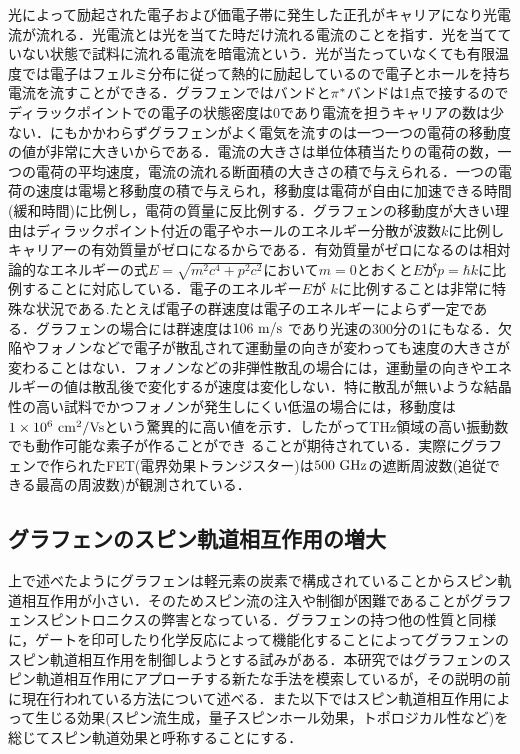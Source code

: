 光によって励起された電子および価電子帯に発生した正孔がキャリアになり光電流が流れる．光電流とは光を当てた時だけ流れる電流のことを指す．光を当てていない状態で試料に流れる電流を暗電流という．光が当たっていなくても有限温度では電子はフェルミ分布に従って熱的に励起しているので電子とホールを持ち電流を流すことができる．グラフェンでは\pi バンドと$\rm\pi^{*}$バンドは1点で接するのでディラックポイントでの電子の状態密度は0であり電流を担うキャリアの数は少ない．にもかかわらずグラフェンがよく電気を流すのは一つ一つの電荷の移動度の値が非常に大きいからである．電流の大きさは単位体積当たりの電荷の数，一つの電荷の平均速度，電流の流れる断面積の大きさの積で与えられる．一つの電荷の速度は電場と移動度の積で与えられ，移動度は電荷が自由に加速できる時間(緩和時間)に比例し，電荷の質量に反比例する．グラフェンの移動度が大きい理由はディラックポイント付近の電子やホールのエネルギー分散が波数$k$に比例しキャリアーの有効質量がゼロになるからである．有効質量がゼロになるのは相対論的なエネルギーの式$E = \sqrt{m^{2}c^{4} + p^{2}c^{2}}$において$m=0$とおくと$E$が$p=\hbar k$に比例することに対応している．電子のエネルギー$E$が $k$に比例することは非常に特殊な状況である.たとえば電子の群速度は電子のエネルギーによらず一定である．グラフェンの場合には群速度は$106\rm\ m/s$ であり光速の300分の1にもなる．欠陥やフォノンなどで電子が散乱されて運動量の向きが変わっても速度の大きさが変わることはない．フォノンなどの非弾性散乱の場合には，運動量の向きやエネルギーの値は散乱後で変化するが速度は変化しない．特に散乱が無いような結晶性の高い試料でかつフォノンが発生しにくい低温の場合には，移動度は$1\times10^{6}\rm\ cm^{2}/Vs$という驚異的に高い値を示す．したがってTHz領域の高い振動数でも動作可能な素子が作ることができ ることが期待されている．実際にグラフェンで作られたFET(電界効果トランジスター)は$500\rm\ GHz$の遮断周波数(追従できる最高の周波数)が観測されている．

\subsection{グラフェンのスピン軌道相互作用の増大}

上で述べたようにグラフェンは軽元素の炭素で構成されていることからスピン軌道相互作用が小さい．そのためスピン流の注入や制御が困難であることがグラフェンスピントロニクスの弊害となっている．グラフェンの持つ他の性質と同様に，ゲートを印可したり化学反応によって機能化することによってグラフェンのスピン軌道相互作用を制御しようとする試みがある．本研究ではグラフェンのスピン軌道相互作用にアプローチする新たな手法を模索しているが，その説明の前に現在行われている方法について述べる．また以下ではスピン軌道相互作用によって生じる効果(スピン流生成，量子スピンホール効果，トポロジカル性など)を総じてスピン軌道効果と呼称することにする．

